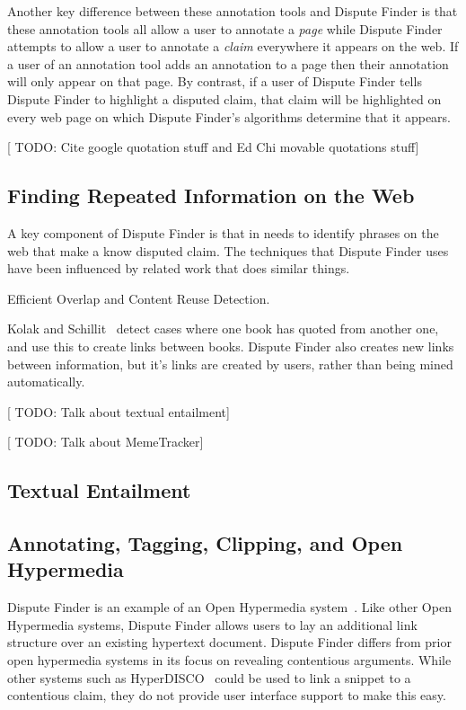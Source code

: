 \documentclass{www2010-submission}
\newcommand{\todo}[1]{{[\color{blue} TODO: #1]}}
\begin{document}
Another key difference between these annotation tools and Dispute Finder is that these annotation tools all allow a user to annotate a {\it page} while Dispute Finder attempts to allow a user to annotate a {\it claim} everywhere it appears on the web. If a user of an annotation tool adds an annotation to a page then their annotation will only appear on that page. By contrast, if a user of Dispute Finder tells Dispute Finder to highlight a disputed claim, that claim will be highlighted on every web page on which Dispute Finder's algorithms determine that it appears.

\todo{Cite google quotation stuff and Ed Chi movable quotations stuff}


\subsection{Finding Repeated Information on the Web}

A key component of Dispute Finder is that in needs to identify phrases on the web that make a know disputed claim. The techniques that Dispute Finder uses have been influenced by related work that does similar things.

\cite{Kim2009} Efficient Overlap and Content Reuse Detection.

\cite{schillit?}

Kolak and Schillit~\cite{Kolak2008} detect cases where one book has quoted from another one, and use this to create links between books. Dispute Finder also creates new links between information, but it's links are created by users, rather than being mined automatically.

\cite{Something by Ed CHi about this}

\todo{Talk about textual entailment}

\todo{Talk about MemeTracker}


\subsection{Textual Entailment}


\subsection{Annotating, Tagging, Clipping, and Open Hypermedia}

Dispute Finder is an example of an Open Hypermedia system~\cite{Bouvin2000}. Like other Open Hypermedia systems, Dispute Finder allows users to lay an additional link structure over an existing hypertext document. Dispute Finder differs from prior open hypermedia systems in its focus on revealing contentious arguments. While other systems such as HyperDISCO~\cite{Wiil1996} could be used to link a snippet to a contentious claim, they do not provide user interface support to make this easy.
\end{document}
